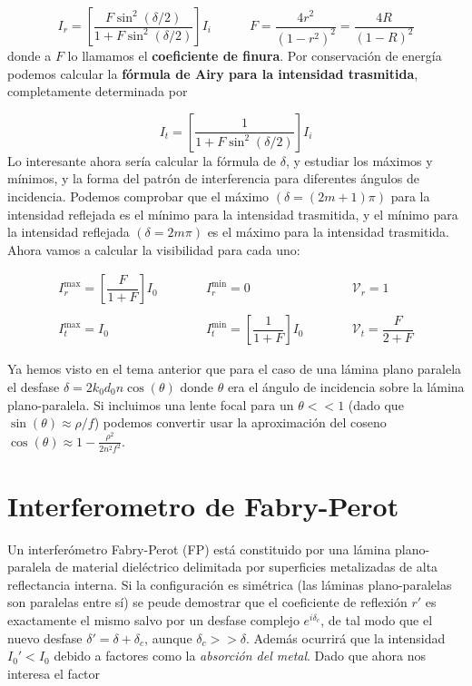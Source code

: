 \documentclass[12pt,a4paper]{book}
\numberwithin{equation}{section}
\numberwithin{figure}{section}
\newcommand{\tquad}{\quad \quad \quad}
\newcommand{\ccorchetes}[1]{\left[ #1  \right]}
\newcommand{\1}{_{(1)}}
\newcommand{\2}{_{(2)}}
\theoremstyle{definition}
\begin{document}
\begin{equation}
I_r =  \ccorchetes{\frac{F \sin^2(\delta/2)}{1+F\sin^2(\delta/2)}} I_i \tquad F = \frac{4r^2}{(1-r^2)^2} = \frac{4R}{(1-R)^2}
\end{equation}
donde a $F$ lo llamamos el \textbf{coeficiente de finura}. Por conservación de energía podemos calcular la \textbf{fórmula de Airy para la intensidad trasmitida}, completamente determinada por

\begin{equation}
I_t = \ccorchetes{ \frac{1}{1+F\sin^2(\delta/2)} }I_i
\end{equation}
Lo interesante ahora sería calcular la fórmula de $\delta$, y estudiar los máximos y mínimos, y la forma del patrón de interferencia para diferentes ángulos de incidencia. Podemos comprobar que el máximo $(\delta=(2m+1)\pi)$ para la intensidad reflejada es el mínimo para la intensidad trasmitida, y el mínimo para la intensidad reflejada $(\delta=2m\pi)$ es el máximo para la intensidad trasmitida. Ahora vamos a calcular la visibilidad para cada uno:

\begin{equation}
\begin{array}{ccc}
I_{r}^{\max} = \ccorchetes{\dfrac{F}{1+F}}I_0 & \tquad I_{r}^{\min} = 0  & \tquad \mathcal{V}_r=1
\\ \\
I_{t}^{\max} = I_0  & \tquad I_{t}^{\min} =  \ccorchetes{\dfrac{1}{1+F}}I_0  & \tquad \mathcal{V}_t=\dfrac{F}{2+F}
\end{array} \label{Ec:04.2-10}
\end{equation}

Ya hemos visto en el tema anterior que para el caso de una lámina plano paralela el desfase $\delta = 2k_0 d_0 n \cos (\theta)$ donde $\theta$ era el ángulo de incidencia sobre la lámina plano-paralela. Si incluimos una lente focal para un $\theta<<1$ (dado que $\sin (\theta) \approx \rho/f$) podemos convertir usar la aproximación del coseno $\cos (\theta) \approx 1 - \frac{\rho^2}{2n^2 f^2}$.

\section{Interferometro de Fabry-Perot}

Un interferómetro Fabry-Perot (FP) está constituido por una lámina plano-paralela de material dieléctrico delimitada por superficies metalizadas de alta reflectancia interna. Si la configuración es simétrica (las láminas plano-paralelas son paralelas entre sí) se peude demostrar que el coeficiente de reflexión $r'$ es exactamente el mismo salvo por un desfase complejo $e^{i \delta_c}$, de tal modo que el nuevo desfase $\delta'=\delta + \delta_c$, aunque $\delta_c>>\delta$. Además ocurrirá que la intensidad $I_0'<I_0$ debido a factores como la \textit{absorción del metal}. Dado que ahora nos interesa el factor 
\end{document}
